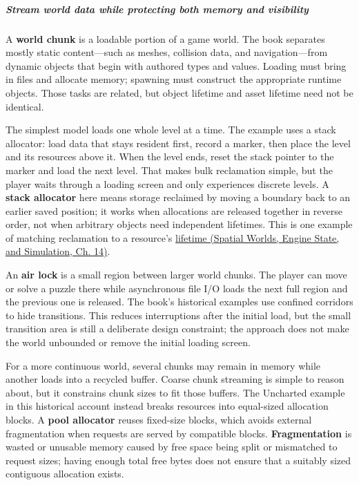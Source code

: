 \subparagraph{Stream world data while protecting both memory and visibility}\label{06-engine-ii-ch032-stream-world-data-while-protecting-both-memory-and-visibility}

A \textbf{world chunk} is a loadable portion of a game world. The book separates mostly static content---such as meshes, collision data, and navigation---from dynamic objects that begin with authored types and values. Loading must bring in files and allocate memory; spawning must construct the appropriate runtime objects. Those tasks are related, but object lifetime and asset lifetime need not be identical.

The simplest model loads one whole level at a time. The example uses a stack allocator: load data that stays resident first, record a marker, then place the level and its resources above it. When the level ends, reset the stack pointer to the marker and load the next level. That makes bulk reclamation simple, but the player waits through a loading screen and only experiences discrete levels. A \textbf{stack allocator} here means storage reclaimed by moving a boundary back to an earlier saved position; it works when allocations are released together in reverse order, not when arbitrary objects need independent lifetimes. This is one example of matching reclamation to a resource's \href{../05-Spatial-Worlds-Engine-State-and-Simulation/main.pdf\#nameddest=05-engine-i-ch014-give-memory-a-lifetime-that-matches-the-work}{lifetime (Spatial Worlds, Engine State, and Simulation, Ch. 14)}.

An \textbf{air lock} is a small region between larger world chunks. The player can move or solve a puzzle there while asynchronous file I/O loads the next full region and the previous one is released. The book's historical examples use confined corridors to hide transitions. This reduces interruptions after the initial load, but the small transition area is still a deliberate design constraint; the approach does not make the world unbounded or remove the initial loading screen.

For a more continuous world, several chunks may remain in memory while another loads into a recycled buffer. Coarse chunk streaming is simple to reason about, but it constrains chunk sizes to fit those buffers. The Uncharted example in this historical account instead breaks resources into equal-sized allocation blocks. A \textbf{pool allocator} reuses fixed-size blocks, which avoids external fragmentation when requests are served by compatible blocks. \textbf{Fragmentation} is wasted or unusable memory caused by free space being split or mismatched to request sizes; having enough total free bytes does not ensure that a suitably sized contiguous allocation exists.

